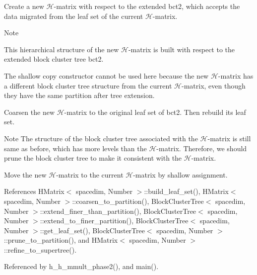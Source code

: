 Create a new $\mathcal{H}$-\/matrix with respect to the extended {\ttfamily bct2}, which accepts the data migrated from the leaf set of the current $\mathcal{H}$-\/matrix.


\begin{DoxyDescription}
\item[Note ]
\begin{DoxyItemize}
\item This hierarchical structure of the new $\mathcal{H}$-\/matrix is built with respect to the extended block cluster tree {\ttfamily bct2}. 
\item The shallow copy constructor cannot be used here because the new $\mathcal{H}$-\/matrix has a different block cluster tree structure from the current $\mathcal{H}$-\/matrix, even though they have the same partition after tree extension. 
\end{DoxyItemize}
\end{DoxyDescription}

Coarsen the new $\mathcal{H}$-\/matrix to the original leaf set of {\ttfamily bct2}. Then rebuild its leaf set.


\begin{DoxyDescription}
\item[Note ]The structure of the block cluster tree associated with the $\mathcal{H}$-\/matrix is still same as before, which has more levels than the $\mathcal{H}$-\/matrix. Therefore, we should prune the block cluster tree to make it consistent with the $\mathcal{H}$-\/matrix. 
\end{DoxyDescription}

Move the new $\mathcal{H}$-\/matrix to the current $\mathcal{H}$-\/matrix by shallow assignment.

References H\+Matrix$<$ spacedim, Number $>$\+::build\+\_\+leaf\+\_\+set(), H\+Matrix$<$ spacedim, Number $>$\+::coarsen\+\_\+to\+\_\+partition(), Block\+Cluster\+Tree$<$ spacedim, Number $>$\+::extend\+\_\+finer\+\_\+than\+\_\+partition(), Block\+Cluster\+Tree$<$ spacedim, Number $>$\+::extend\+\_\+to\+\_\+finer\+\_\+partition(), Block\+Cluster\+Tree$<$ spacedim, Number $>$\+::get\+\_\+leaf\+\_\+set(), Block\+Cluster\+Tree$<$ spacedim, Number $>$\+::prune\+\_\+to\+\_\+partition(), and H\+Matrix$<$ spacedim, Number $>$\+::refine\+\_\+to\+\_\+supertree().



Referenced by h\+\_\+h\+\_\+mmult\+\_\+phase2(), and main().

\mbox{\label{classHMatrix_a00bdd40f7fcf5c912c34c427df518300}} 
